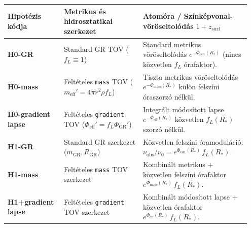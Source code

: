 \par
\begin{center}\vspace{-2pt}
{\footnotesize
\begin{tabular}{@{}>{\bfseries}p{0.22\linewidth}p{0.31\linewidth}p{0.42\linewidth}@{}}
\toprule
Hipot\'ezis k\'odja & Metrikus \'es hidrosztatikai szerkezet & Atom\'ora / Sz\'ink\'epvonal-v\"or\"oseltol\'od\'as $1 + z_{\text{surf}}$ \\
\midrule
H0-GR & Standard GR TOV ($f_L \equiv 1$) & Standard metrikus v\"or\"oseltol\'od\'as $e^{-\Phi_{\text{GR}}(R_*)}$ (nincs k\"ozvetlen $f_L$ \'orafaktor). \\
H0-mass & Felt\'eteles \texttt{mass} TOV ($m_{\text{eff}}' = 4\pi r^2\rho f_L$) & Tiszta metrikus v\"or\"oseltol\'od\'as $e^{-\Phi_{\text{mass}}(R_*)}$ k\"ul\"on felsz\'ini \'oraszorz\'o n\'elk\"ul. \\
H0-gradient lapse & Felt\'eteles \texttt{gradient} TOV ($\Phi_{\text{eff}}' = f_L\Phi_{\text{GR}}'$) & Integr\'alt m\'odos\'itott lapse $e^{-\Phi_{\text{eff}}(R_*)}$ k\"ozvetlen $f_L(R_*)$ szorz\'o n\'elk\"ul. \\
H1-GR & Standard GR szerkezet ($m_{\text{GR}}, R_{\text{GR}}$) & K\"ozvetlen felsz\'ini \'oramodul\'aci\'o: $\nu_{\text{obs}}/\nu_0 = e^{\Phi_{\text{GR}}(R_*)}\,f_L(R_*)$. \\
H1-mass & Felt\'eteles \texttt{mass} TOV szerkezet & Kombin\'alt metrikus + k\"ozvetlen felsz\'ini \'orafaktor $e^{\Phi_{\text{mass}}(R_*)}\,f_L(R_*)$. \\
H1+gradient lapse & Felt\'eteles \texttt{gradient} TOV szerkezet & Kombin\'alt m\'odos\'itott lapse + k\"ozvetlen \'orafaktor $e^{\Phi_{\text{eff}}(R_*)}\,f_L(R_*)$. \\
\bottomrule
\end{tabular}}
\end{center}

